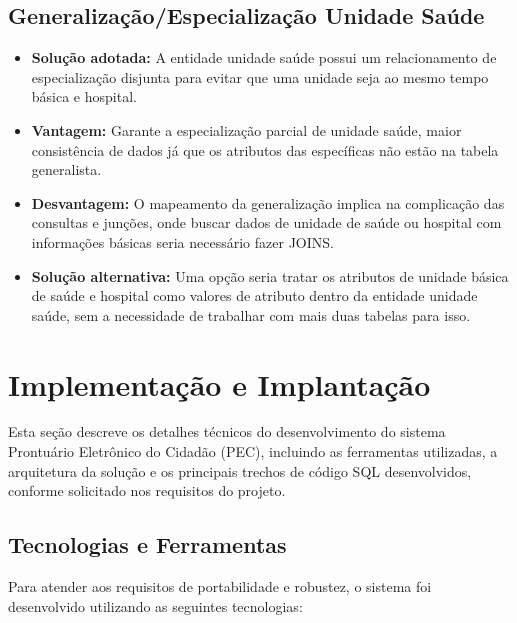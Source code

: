 \documentclass[12pt, a4paper]{article}
\begin{document}
\subsection{Generalização/Especialização Unidade Saúde}
\begin{itemize}
    \item \textbf{Solução adotada:} A entidade unidade saúde possui um relacionamento de
especialização disjunta para evitar que uma unidade seja ao mesmo tempo básica e
hospital.

    \item \textbf{Vantagem:} Garante a especialização parcial de unidade saúde, maior consistência de
dados já que os atributos das específicas não estão na tabela generalista.

    \item \textbf{Desvantagem:} O mapeamento da generalização implica na complicação das consultas e
junções, onde buscar dados de unidade de saúde ou hospital com informações básicas
seria necessário fazer JOINS.

    \item \textbf{Solução alternativa:} Uma opção seria tratar os atributos de unidade básica de saúde e
hospital como valores de atributo dentro da entidade unidade saúde, sem a necessidade de trabalhar com mais duas tabelas para isso.

\end{itemize}

\newpage

\section{Implementação e Implantação}

Esta seção descreve os detalhes técnicos do desenvolvimento do sistema Prontuário Eletrônico do Cidadão (PEC), incluindo as ferramentas utilizadas, a arquitetura da solução e os principais trechos de código SQL desenvolvidos, conforme solicitado nos requisitos do projeto.

\subsection{Tecnologias e Ferramentas}
Para atender aos requisitos de portabilidade e robustez, o sistema foi desenvolvido utilizando as seguintes tecnologias:
\end{document}
